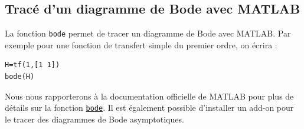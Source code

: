 \subsection{Tracé d'un diagramme de Bode avec MATLAB}
La fonction \texttt{bode} permet de tracer un diagramme de Bode avec MATLAB.
Par exemple pour une fonction de transfert simple du premier ordre, on écrira :
\begin{verbatim}
H=tf(1,[1 1]) 
bode(H)
\end{verbatim}
Nous nous rapporterons à la documentation officielle de MATLAB pour
plus de détails sur la fonction 
\href{https://fr.mathworks.com/help/control/ref/dynamicsystem.bode.html}
     {\texttt{bode}}.
Il est également possible d'installer un add-on pour le tracer des diagrammes 
de Bode asymptotiques.
